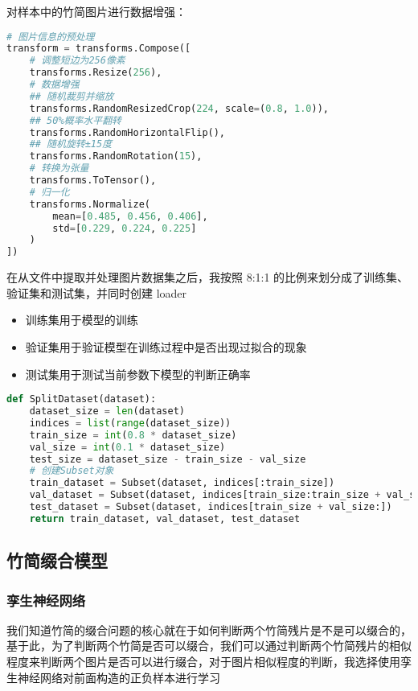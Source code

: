 \documentclass{article}
\begin{document}
对样本中的竹简图片进行数据增强：
\begin{lstlisting}[language=Python]
# 图片信息的预处理
transform = transforms.Compose([
    # 调整短边为256像素
    transforms.Resize(256),
    # 数据增强
    ## 随机裁剪并缩放
    transforms.RandomResizedCrop(224, scale=(0.8, 1.0)),
    ## 50%概率水平翻转
    transforms.RandomHorizontalFlip(),
    ## 随机旋转±15度
    transforms.RandomRotation(15), 
    # 转换为张量
    transforms.ToTensor(),
    # 归一化   
    transforms.Normalize(       
        mean=[0.485, 0.456, 0.406], 
        std=[0.229, 0.224, 0.225]
    )   
])
\end{lstlisting}

在从文件中提取并处理图片数据集之后，我按照 8:1:1 的比例来划分成了训练集、验证集和测试集，并同时创建 loader
\begin{itemize}
    \item 训练集用于模型的训练
    \item 验证集用于验证模型在训练过程中是否出现过拟合的现象
    \item 测试集用于测试当前参数下模型的判断正确率
\end{itemize}

\begin{lstlisting}[language=Python]
def SplitDataset(dataset):
    dataset_size = len(dataset)
    indices = list(range(dataset_size))
    train_size = int(0.8 * dataset_size)
    val_size = int(0.1 * dataset_size)
    test_size = dataset_size - train_size - val_size
    # 创建Subset对象
    train_dataset = Subset(dataset, indices[:train_size])
    val_dataset = Subset(dataset, indices[train_size:train_size + val_size])
    test_dataset = Subset(dataset, indices[train_size + val_size:])
    return train_dataset, val_dataset, test_dataset
\end{lstlisting}

\subsection{竹简缀合模型}

\subsubsection{孪生神经网络}

我们知道竹简的缀合问题的核心就在于如何判断两个竹简残片是不是可以缀合的，基于此，为了判断两个竹简是否可以缀合，我们可以通过判断两个竹简残片的相似程度来判断两个图片是否可以进行缀合，对于图片相似程度的判断，我选择使用孪生神经网络对前面构造的正负样本进行学习
\end{document}
